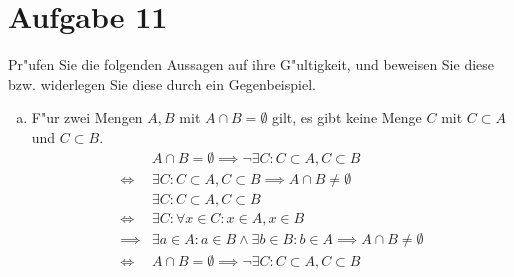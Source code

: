 \section{Aufgabe 11}
\setcounter{section}{11}

Pr"ufen Sie die folgenden Aussagen auf ihre G"ultigkeit, und beweisen Sie diese
bzw. widerlegen Sie diese durch ein Gegenbeispiel.

\begin{enumerate}[(a)]
    \item F"ur zwei Mengen $A,B$ mit $A \cap B = \emptyset$ gilt, es gibt keine
        Menge $C$ mit $C \subset A$ und $C \subset B$.
        \begin{align*}
                     &A \cap B = \emptyset \implies \lnot\exists C : C \subset A, C \subset B \\
            \iff     &\exists C : C \subset A, C \subset B \implies A \cap B \neq \emptyset \\[10pt]
                     &\exists C : C \subset A, C \subset B \\
            \iff     &\exists C : \forall x \in C : x \in A, x \in B \\ 
            \implies &\exists a \in A : a \in B \land \exists b \in B : b \in A \implies A \cap B \neq \emptyset \\[10pt]
            \iff     &A \cap B = \emptyset \implies \lnot\exists C : C \subset A, C \subset B
        \end{align*}


\end{enumerate}
